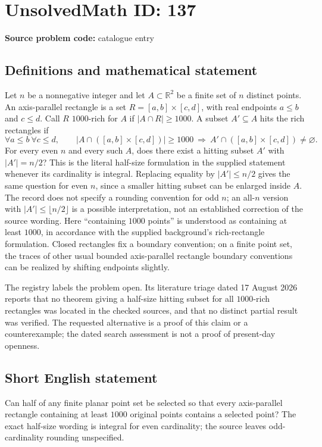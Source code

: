 \documentclass[11pt]{article}
\newcommand{\R}{\mathbb{R}}
\begin{document}
\section*{UnsolvedMath ID: 137}
\textbf{Source problem code:} catalogue entry
\subsection{Definitions and mathematical statement}
Let $n$ be a nonnegative integer and let $A\subset\R^2$ be a finite set of $n$ distinct points. An axis-parallel rectangle is a set $R=[a,b]\times[c,d]$, with real endpoints $a\le b$ and $c\le d$. Call $R$ $1000$-rich for $A$ if $|A\cap R|\ge1000$. A subset $A'\subseteq A$ hits the rich rectangles if
\[
 \forall a\le b\ \forall c\le d,\qquad
 |A\cap([a,b]\times[c,d])|\ge1000
 \ \Longrightarrow\ A'\cap([a,b]\times[c,d])\ne\varnothing.
\]
For every even $n$ and every such $A$, does there exist a hitting subset $A'$ with $|A'|=n/2$? This is the literal half-size formulation in the supplied statement whenever its cardinality is integral. Replacing equality by $|A'|\le n/2$ gives the same question for even $n$, since a smaller hitting subset can be enlarged inside $A$. The record does not specify a rounding convention for odd $n$; an all-$n$ version with $|A'|\le\lfloor n/2\rfloor$ is a possible interpretation, not an established correction of the source wording. Here ``containing $1000$ points'' is understood as containing at least $1000$, in accordance with the supplied background's rich-rectangle formulation. Closed rectangles fix a boundary convention; on a finite point set, the traces of other usual bounded axis-parallel rectangle boundary conventions can be realized by shifting endpoints slightly.

The registry labels the problem open. Its literature triage dated 17 August 2026 reports that no theorem giving a half-size hitting subset for all $1000$-rich rectangles was located in the checked sources, and that no distinct partial result was verified. The requested alternative is a proof of this claim or a counterexample; the dated search assessment is not a proof of present-day openness.
\subsection{Short English statement}
Can half of any finite planar point set be selected so that every axis-parallel rectangle containing at least $1000$ original points contains a selected point? The exact half-size wording is integral for even cardinality; the source leaves odd-cardinality rounding unspecified.
\end{document}
